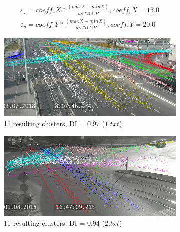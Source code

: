 \begin{subequations}\label{eq:eps-adapt-234}
	\begin{align}
		\varepsilon_x = coeff_{\varepsilon}X * \frac{(maxX - minX)}{distToCP}, coeff_{\varepsilon}X = 15.0 \\
		\varepsilon_y = coeff_{\varepsilon}Y * \frac{(maxX - minX)}{distToCP}, coeff_{\varepsilon}Y = 20.0
	\end{align}
\end{subequations}

\begin{figure}[!htb]
	\centering
	\begin{subfigure}[!htb]{0.23\textwidth}
		\centering{}
		\includegraphics[width=\textwidth]{images/cl-res/clust-res-1-pr-diff-coeff-1.png}
		\caption{11 resulting clusters, DI = 0.97 ($1.txt$)}
		\label{fig:clust-res-1-pr-diff-coeff-1}
	\end{subfigure}
	\hfill
	\begin{subfigure}[!htb]{0.23\textwidth}
		\centering{}
		\includegraphics[width=\textwidth]{images/cl-res/clust-res-1-pr-diff-coeff-2.png}
		\caption{11 resulting clusters, DI = 0.94 ($2.txt$)}
		\label{fig:clust-res-1-pr-diff-coeff-2}
	\end{subfigure}
	\hfill
	\begin{subfigure}[!htb]{0.23\textwidth}
		\centering{}

\end{subfigure}
\end{figure}

